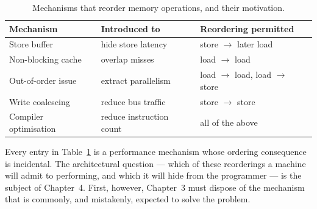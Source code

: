 \begin{table}[H]
\centering
\small
\caption{Mechanisms that reorder memory operations, and their motivation.}
\label{tab:mechanisms}
\begin{tabular}{@{}lll@{}}
\toprule
\textbf{Mechanism} & \textbf{Introduced to} & \textbf{Reordering permitted} \\
\midrule
Store buffer            & hide store latency        & store $\rightarrow$ later load \\
Non-blocking cache      & overlap misses            & load $\rightarrow$ load \\
Out-of-order issue      & extract parallelism       & load $\rightarrow$ load, load $\rightarrow$ store \\
Write coalescing        & reduce bus traffic        & store $\rightarrow$ store \\
Compiler optimisation   & reduce instruction count  & all of the above \\
\bottomrule
\end{tabular}
\end{table}

Every entry in Table~\ref{tab:mechanisms} is a performance mechanism whose
ordering consequence is incidental. The architectural question --- which of these
reorderings a machine will admit to performing, and which it will hide from the
programmer --- is the subject of Chapter~4.
First, however, Chapter~3 must dispose
of the mechanism that is commonly, and mistakenly, expected to solve the problem.
